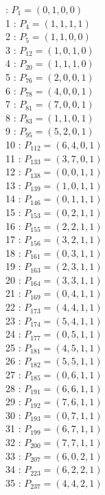 \documentclass{article}
\begin{document}
{\begin{multicols}{3}
 : $P_{1}=( 0, 1, 0, 0 )$\\
1 : $P_{4}=( 1, 1, 1, 1 )$\\
2 : $P_{5}=( 1, 1, 0, 0 )$\\
3 : $P_{12}=( 1, 0, 1, 0 )$\\
4 : $P_{20}=( 1, 1, 1, 0 )$\\
5 : $P_{76}=( 2, 0, 0, 1 )$\\
6 : $P_{78}=( 4, 0, 0, 1 )$\\
7 : $P_{81}=( 7, 0, 0, 1 )$\\
8 : $P_{83}=( 1, 1, 0, 1 )$\\
9 : $P_{95}=( 5, 2, 0, 1 )$\\
10 : $P_{112}=( 6, 4, 0, 1 )$\\
11 : $P_{133}=( 3, 7, 0, 1 )$\\
12 : $P_{138}=( 0, 0, 1, 1 )$\\
13 : $P_{139}=( 1, 0, 1, 1 )$\\
14 : $P_{146}=( 0, 1, 1, 1 )$\\
15 : $P_{153}=( 0, 2, 1, 1 )$\\
16 : $P_{155}=( 2, 2, 1, 1 )$\\
17 : $P_{156}=( 3, 2, 1, 1 )$\\
18 : $P_{161}=( 0, 3, 1, 1 )$\\
19 : $P_{163}=( 2, 3, 1, 1 )$\\
20 : $P_{164}=( 3, 3, 1, 1 )$\\
21 : $P_{169}=( 0, 4, 1, 1 )$\\
22 : $P_{173}=( 4, 4, 1, 1 )$\\
23 : $P_{174}=( 5, 4, 1, 1 )$\\
24 : $P_{177}=( 0, 5, 1, 1 )$\\
25 : $P_{181}=( 4, 5, 1, 1 )$\\
26 : $P_{182}=( 5, 5, 1, 1 )$\\
27 : $P_{185}=( 0, 6, 1, 1 )$\\
28 : $P_{191}=( 6, 6, 1, 1 )$\\
29 : $P_{192}=( 7, 6, 1, 1 )$\\
30 : $P_{193}=( 0, 7, 1, 1 )$\\
31 : $P_{199}=( 6, 7, 1, 1 )$\\
32 : $P_{200}=( 7, 7, 1, 1 )$\\
33 : $P_{207}=( 6, 0, 2, 1 )$\\
34 : $P_{223}=( 6, 2, 2, 1 )$\\
35 : $P_{237}=( 4, 4, 2, 1 )$\\

\end{multicols}}
\end{document}
